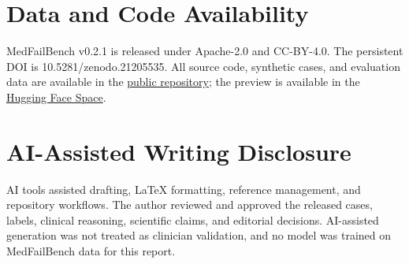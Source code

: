 \documentclass[11pt,a4paper]{article}
\begin{document}



\section*{Data and Code Availability}
MedFailBench v0.2.1 is released under Apache-2.0 and CC-BY-4.0.
The persistent DOI is 10.5281/zenodo.21205535.
All source code, synthetic cases, and evaluation data are available in the
\href{https://github.com/goktugozkanmd/medical-ai-failure-atlas}{public repository};
the preview is available in the
\href{https://huggingface.co/spaces/goktugozkanmd/medical-ai-failure-atlas}{Hugging Face Space}.

\section*{AI-Assisted Writing Disclosure}
AI tools assisted drafting, LaTeX formatting, reference management, and
repository workflows. The author reviewed and approved the released cases,
labels, clinical reasoning, scientific claims, and editorial decisions.
AI-assisted generation was not treated as clinician validation, and no model
was trained on MedFailBench data for this report.
\end{document}
